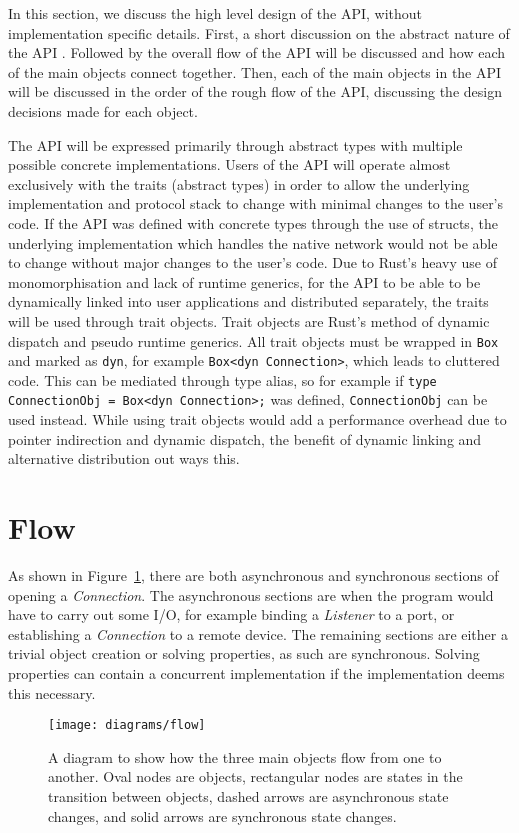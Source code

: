 In this section, we discuss the high level design of the API, without implementation specific details.
First, a short discussion on the abstract nature of the API .
Followed by the overall flow of the API will be discussed and how each of the main objects connect together.
Then, each of the main objects in the API will be discussed in the order of the rough flow of the API, discussing
the design decisions made for each object.

The API will be expressed primarily through abstract types with multiple possible concrete implementations.
Users of the API will operate almost exclusively with the traits (abstract types) in order to allow the underlying
implementation and protocol stack to change with minimal changes to the user's code.
If the API was defined with concrete types through the use of structs, the underlying implementation which handles
the native network would not be able to change without major changes to the user's code.
Due to Rust's heavy use of monomorphisation and lack of runtime generics, for the API to be able to be dynamically
linked into user applications and distributed separately, the traits will be used through trait objects.
Trait objects are Rust's method of dynamic dispatch and pseudo runtime generics.
All trait objects must be wrapped in \texttt{Box} and marked as \texttt{dyn}, for example
\texttt{Box<dyn Connection>}, which leads to cluttered code.
This can be mediated through type alias, so for example if \texttt{type ConnectionObj = Box<dyn Connection>;} was
defined, \texttt{ConnectionObj} can be used instead.
While using trait objects would add a performance overhead due to pointer indirection and dynamic dispatch, the benefit
of dynamic linking and alternative distribution out ways this.

\section{Flow}\label{sec:flow}
As shown in Figure~\ref{fig:flow}, there are both asynchronous and synchronous sections of opening a \emph{Connection}.
The asynchronous sections are when the program would have to carry out some I/O, for example binding a \emph{Listener}
to a port, or establishing a \emph{Connection} to a remote device.
The remaining sections are either a trivial object creation or solving properties, as such are synchronous.
Solving properties can contain a concurrent implementation if the implementation deems this necessary.

\begin{figure}[h]
\centering
\texttt{[image: diagrams/flow]}
\caption{A diagram to show how the three main objects flow from one to another.
Oval nodes are objects, rectangular nodes are states in the transition between objects, dashed arrows are
asynchronous state changes, and solid arrows are synchronous state changes.}
\label{fig:flow}
\end{figure}

